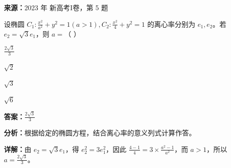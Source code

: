 \begin{question}[points=5]
\textbf{来源：}2023 年 新高考I卷，第 5 题\par
设椭圆 $C_1:\frac{x^2}{a^2}+y^2=1(a>1), C_2:\frac{x^2}{4}+y^2=1$ 的离心率分别为 $e_1, e_2$。若 $e_2=\sqrt{3}e_1$，则 $a=$（ ）
\begin{choices}
  \item $\frac{2\sqrt{3}}{3}$
  \item $\sqrt{2}$
  \item $\sqrt{3}$
  \item $\sqrt{6}$
\end{choices}
\begin{solution}
\textbf{答案：}$\frac{2\sqrt{3}}{3}$

\textbf{分析：}根据给定的椭圆方程，结合离心率的意义列式计算作答。

\textbf{详解：}由 $e_2=\sqrt{3}e_1$，得 $e_2^2=3e_1^2$，因此 $\frac{4-1}{4}=3\times\frac{a^2-1}{a^2}$，而 $a>1$，所以 $a=\frac{2\sqrt{3}}{3}$。
\end{solution}
\end{question}

